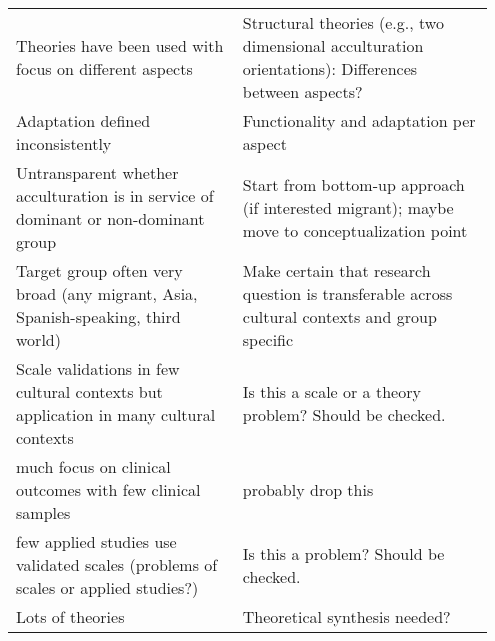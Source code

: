 \begin{table}
\begin{tabular}{>{\raggedright\arraybackslash}p{0.45\linewidth} 
>{\raggedright\arraybackslash}p{0.50\linewidth}}
\vspace{-0.5em} Theories have been used with focus on different aspects & 
\vspace{-0.5em} Structural theories (e.g., two dimensional acculturation orientations): Differences between aspects?  \\ 

\vspace{-0.5em} Adaptation defined inconsistently & 
\vspace{-0.5em} Functionality and adaptation per aspect                                                               \\ 

\vspace{-0.5em} Untransparent whether acculturation is in service of dominant or non-dominant group & 
\vspace{-0.5em} Start from bottom-up approach (if interested migrant); maybe move to conceptualization point          \\ 

\vspace{-0.5em} Target group often very broad (any migrant, Asia, Spanish-speaking, third world) & 
\vspace{-0.5em} Make certain that research question is transferable across cultural contexts and group specific       \\ 

\vspace{-0.5em} Scale validations in few cultural contexts but application in many cultural contexts & 
\vspace{-0.5em} Is this a scale or a theory problem? Should be checked.                                               \\ 

\vspace{-0.5em} much focus on clinical outcomes with few clinical samples & 
\vspace{-0.5em} probably drop this                                                                                    \\ 

\vspace{-0.5em} few applied studies use validated scales (problems of scales or applied studies?) & 
\vspace{-0.5em} Is this a problem? Should be checked.                                                                 \\ 

\vspace{-0.5em} Lots of theories & 
\vspace{-0.5em} Theoretical synthesis needed?                                                                         \\ 

\hline
\end{tabular}
\end{table}

